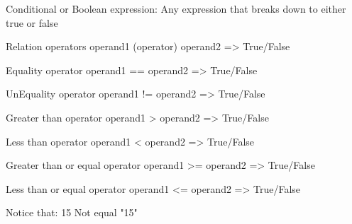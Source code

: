 Conditional or Boolean expression:
  Any expression that breaks down to either true or false

Relation operators 
  operand1 (operator) operand2  => True/False

Equality operator
  operand1 == operand2  => True/False

UnEquality operator 
  operand1 != operand2  => True/False

Greater than operator 
  operand1 > operand2  => True/False

Less than operator 
  operand1 < operand2  => True/False

Greater than or equal operator 
    operand1 >= operand2  => True/False


Less than or equal operator 
    operand1 <= operand2  => True/False

Notice that:
15 Not equal "15"

